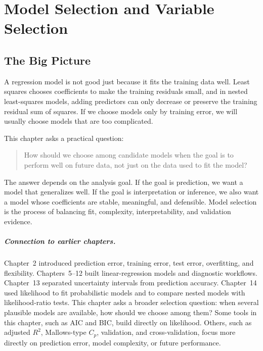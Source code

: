 \chapter[Model Selection and Variable Selection]{Model Selection and Variable Selection}
\label{chap:model-selection-variable-selection}

\section{The Big Picture}

A regression model is not good just because it fits the training data well.  Least squares chooses coefficients to make the training residuals small, and in nested least-squares models, adding predictors can only decrease or preserve the training residual sum of squares.  If we choose models only by training error, we will usually choose models that are too complicated.

This chapter asks a practical question:
\begin{quote}
  How should we choose among candidate models when the goal is to perform well on future data, not just on the data used to fit the model?
\end{quote}

The answer depends on the analysis goal.  If the goal is prediction, we want a model that generalizes well.  If the goal is interpretation or inference, we also want a model whose coefficients are stable, meaningful, and defensible.  Model selection is the process of balancing fit, complexity, interpretability, and validation evidence.

\paragraph{Connection to earlier chapters.}
Chapter~2 introduced prediction error, training error, test error, overfitting, and flexibility.  Chapters~5--12 built linear-regression models and diagnostic workflows.  Chapter~13 separated uncertainty intervals from prediction accuracy.  Chapter~14 used likelihood to fit probabilistic models and to compare nested models with likelihood-ratio tests.  This chapter asks a broader selection question: when several plausible models are available, how should we choose among them?  Some tools in this chapter, such as AIC and BIC, build directly on likelihood.  Others, such as adjusted \(R^2\), Mallows-type \(C_p\), validation, and cross-validation, focus more directly on prediction error, model complexity, or future performance.

